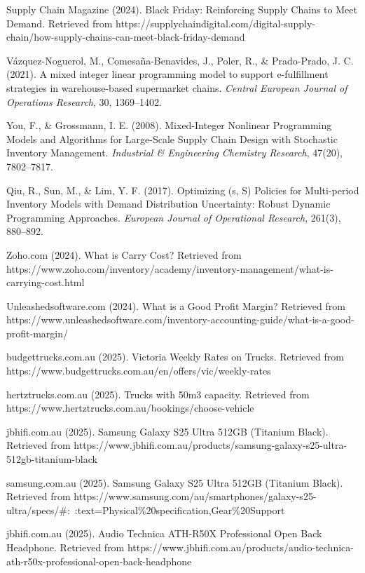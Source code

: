 \documentclass[a4paper,12pt]{article}
\begin{document}
\begin{thebibliography}{99}
Supply Chain Magazine (2024).
Black Friday: Reinforcing Supply Chains to Meet Demand.
Retrieved from https://supplychaindigital.com/digital-supply-chain/how-supply-chains-can-meet-black-friday-demand

Vázquez-Noguerol, M., Comesaña-Benavides, J., Poler, R., \& Prado-Prado, J. C. (2021).
A mixed integer linear programming model to support e-fulfillment strategies in warehouse-based supermarket chains. \textit{Central European Journal of Operations Research}, 30, 1369--1402.

You, F., \& Grossmann, I. E. (2008).
Mixed-Integer Nonlinear Programming Models and Algorithms for Large-Scale Supply Chain Design with Stochastic Inventory Management. \textit{Industrial \& Engineering Chemistry Research}, 47(20), 7802--7817.

Qiu, R., Sun, M., \& Lim, Y. F. (2017).
Optimizing (s, S) Policies for Multi-period Inventory Models with Demand Distribution Uncertainty: Robust Dynamic Programming Approaches. \textit{European Journal of Operational Research}, 261(3), 880--892.

Zoho.com (2024).
What is Carry Cost?
Retrieved from https://www.zoho.com/inventory/academy/inventory-management/what-is-carrying-cost.html

Unleashedsoftware.com (2024).
What is a Good Profit Margin?
Retrieved from https://www.unleashedsoftware.com/inventory-accounting-guide/what-is-a-good-profit-margin/

budgettrucks.com.au (2025).
Victoria Weekly Rates on Trucks.
Retrieved from https://www.budgettrucks.com.au/en/offers/vic/weekly-rates

hertztrucks.com.au (2025).
Trucks with 50m3 capacity.
Retrieved from https://www.hertztrucks.com.au/bookings/choose-vehicle

jbhifi.com.au (2025).
Samsung Galaxy S25 Ultra 512GB (Titanium Black).
Retrieved from https://www.jbhifi.com.au/products/samsung-galaxy-s25-ultra-512gb-titanium-black

samsung.com.au (2025).
Samsung Galaxy S25 Ultra 512GB (Titanium Black).
Retrieved from https://www.samsung.com/au/smartphones/galaxy-s25-ultra/specs/\#:~:text=Physical\%20specification,Gear\%20Support

jbhifi.com.au (2025).
Audio Technica ATH-R50X Professional Open Back Headphone.
Retrieved from https://www.jbhifi.com.au/products/audio-technica-ath-r50x-professional-open-back-headphone


\end{thebibliography}
\end{document}
